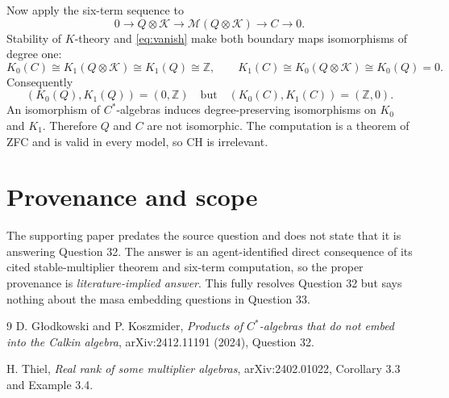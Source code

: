 \documentclass[11pt]{article}
\newcommand{\K}{\mathcal K}
\newcommand{\M}{\mathcal M}
\begin{document}
Now apply the six-term sequence to
\[
 0\longrightarrow Q\otimes\K
 \longrightarrow\M(Q\otimes\K)
 \longrightarrow C\longrightarrow0.
\]
Stability of $K$-theory and \eqref{eq:vanish} make both boundary maps isomorphisms of degree one:
\[
 K_0(C)\cong K_1(Q\otimes\K)\cong K_1(Q)\cong\mathbb Z,
 \qquad
 K_1(C)\cong K_0(Q\otimes\K)\cong K_0(Q)=0.
\]
Consequently
\[
 (K_0(Q),K_1(Q))=(0,\mathbb Z)
 \quad\text{but}\quad
 (K_0(C),K_1(C))=(\mathbb Z,0).
\]
An isomorphism of $C^*$-algebras induces degree-preserving isomorphisms on $K_0$ and $K_1$.  Therefore $Q$ and $C$ are not isomorphic.  The computation is a theorem of ZFC and is valid in every model, so CH is irrelevant.

\section*{Provenance and scope}
The supporting paper predates the source question and does not state that it is answering Question 32.  The answer is an agent-identified direct consequence of its cited stable-multiplier theorem and six-term computation, so the proper provenance is \emph{literature-implied answer}.  This fully resolves Question 32 but says nothing about the masa embedding questions in Question 33.

\begin{thebibliography}{9}
D. G\l odkowski and P. Koszmider,
\emph{Products of $C^*$-algebras that do not embed into the Calkin algebra},
arXiv:2412.11191 (2024), Question 32.

H. Thiel,
\emph{Real rank of some multiplier algebras},
arXiv:2402.01022, Corollary 3.3 and Example 3.4.
\end{thebibliography}
\end{document}
